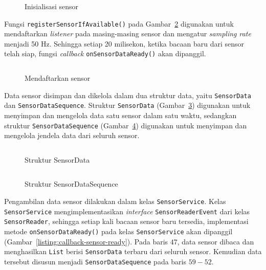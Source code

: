 \begin{figure}[h]
    \inputminted[firstline=14,firstnumber=14,lastline=32]{java}{../aktvtas/app/src/main/java/org/elins/aktvtas/sensor/SensorReader.java}
    \caption{Inisialisasi sensor}
    \label{listing:inisialisasi-sensor}
\end{figure}

Fungsi \texttt{registerSensorIfAvailable()} pada Gambar~\ref{listing:mendaftarkan-sensor} digunakan untuk mendaftarkan \textit{listener} pada masing-masing sensor dan mengatur \textit{sampling rate} menjadi 50 Hz. Sehingga setiap 20 milisekon, ketika bacaan baru dari sensor telah siap, fungsi \textit{callback} \texttt{onSensorDataReady()} akan dipanggil.

\begin{figure}[h]
    \inputminted[firstline=38,firstnumber=38,lastline=44,gobble=4]{java}{../aktvtas/app/src/main/java/org/elins/aktvtas/sensor/SensorReader.java}
    \caption{Mendaftarkan sensor}
    \label{listing:mendaftarkan-sensor}
\end{figure}

Data sensor disimpan dan dikelola dalam dua struktur data, yaitu \texttt{SensorData} dan \texttt{SensorDataSequence}. Struktur \texttt{SensorData} (Gambar~\ref{listing:sensor-data}) digunakan untuk menyimpan dan mengelola data satu sensor dalam satu waktu, sedangkan struktur \texttt{SensorDataSequence} (Gambar~\ref{listing:sensor-data-sequence}) digunakan untuk menyimpan dan mengelola jendela data dari seluruh sensor.

\begin{figure}[h]
    \inputminted[firstline=6,firstnumber=6,lastline=16]{java}{../aktvtas/app/src/main/java/org/elins/aktvtas/sensor/SensorData.java}
    \caption{Struktur SensorData}
    \label{listing:sensor-data}
\end{figure}

\begin{figure}[h]
    \inputminted[firstline=9,firstnumber=9,lastline=13]{java}{../aktvtas/app/src/main/java/org/elins/aktvtas/sensor/SensorDataSequence.java}
    \caption{Struktur SensorDataSequence}
    \label{listing:sensor-data-sequence}
\end{figure}

Pengambilan data sensor dilakukan dalam kelas \texttt{SensorService}. Kelas \texttt{SensorService} mengimplementasikan \textit{interface} \texttt{SensorReaderEvent} dari kelas \texttt{SensorReader}, sehingga setiap kali bacaan sensor baru tersedia, implementasi metode \texttt{onSensorDataReady()} pada kelas \texttt{SensorService} akan dipanggil (Gambar~\ref{listing:callback-sensor-ready}). Pada baris $47$, data sensor dibaca dan menghasilkan \texttt{List} berisi \texttt{SensorData} terbaru dari seluruh sensor. Kemudian data tersebut disusun menjadi \texttt{SensorDataSequence} pada baris $59-52$.

